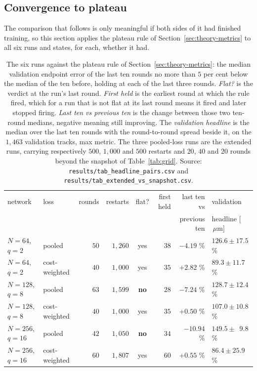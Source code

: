 \documentclass[11pt,a4paper]{article}
\newcommand{\um}{\ensuremath{\,\mu\mathrm{m}}}
\begin{document}
\subsection{Convergence to plateau}
\label{sec:results-plateau}

The comparison that follows is only meaningful if both sides of it had finished
training, so this section applies the plateau rule of
Section~\ref{sec:theory-metrics} to all six runs and states, for each, whether
it had.

\begin{table}[tbp]
  \centering
  \caption{The six runs against the plateau rule of
  Section~\ref{sec:theory-metrics}: the median validation endpoint error of the
  last ten rounds no more than $5$ per cent below the median of the ten before,
  holding at each of the last three rounds. \emph{Flat?} is the verdict at the
  run's last round. \emph{First held} is the earliest round at which the rule
  fired, which for a run that is not flat at its last round means it fired and
  later stopped firing. \emph{Last ten vs previous ten} is the change between
  those two ten-round medians, negative meaning still improving. The
  \emph{validation headline} is the median over the last ten rounds with the
  round-to-round spread beside it, on the $1{,}463$ validation tracks, max
  metric. The three pooled-loss runs are the extended runs, carrying
  respectively $500$, $1{,}000$ and $500$ restarts and $20$, $40$ and $20$
  rounds beyond the snapshot of Table~\ref{tab:grid}. Source:
  \texttt{results/tab\_headline\_pairs.csv} and
  \texttt{results/tab\_extended\_vs\_snapshot.csv}.}
  \label{tab:convergence}
  \footnotesize
  \setlength{\tabcolsep}{5pt}
  \begin{tabular}{llrrcrrl}
    \toprule
    network & loss & rounds & restarts & flat? & first held &
    last ten vs & validation \\
    & & & & & & previous ten & headline [\!\um] \\
    \midrule
    $N = 64$, $q = 2$    & pooled        & $50$ & $1{,}260$ & yes & $38$ & $-4.19$ \% & $126.6 \pm 17.5$ \% \\
    $N = 64$, $q = 2$    & cost-weighted & $40$ & $1{,}000$ & yes & $35$ & $+2.82$ \% & $89.3 \pm 11.7$ \% \\
    $N = 128$, $q = 8$   & pooled        & $63$ & $1{,}599$ & \textbf{no} & $28$ & $-7.24$ \% & $128.7 \pm 12.4$ \% \\
    $N = 128$, $q = 8$   & cost-weighted & $40$ & $1{,}000$ & yes & $35$ & $+0.50$ \% & $107.0 \pm 10.8$ \% \\
    $N = 256$, $q = 16$  & pooled        & $42$ & $1{,}050$ & \textbf{no} & $34$ & $-10.94$ \% & $149.5 \pm \phantom{0}9.8$ \% \\
    $N = 256$, $q = 16$  & cost-weighted & $60$ & $1{,}807$ & yes & $60$ & $+0.55$ \% & $86.4 \pm 25.9$ \% \\
    \bottomrule
  \end{tabular}
\end{table}
\end{document}
